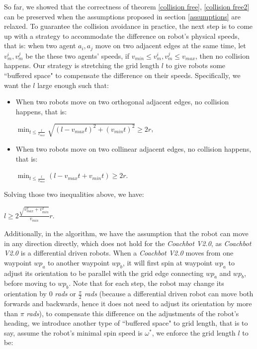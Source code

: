 \documentclass[journal]{IEEEtran}
\begin{document}
So far, we showed that the correctness of theorem \ref{collision free}, \ref{collision free2} can be preserved when the assumptions proposed in section \ref{assumptions} are relaxed. To guarantee the collision avoidance in practice, the next step is to come up with a strategy to accommodate the difference on robot's physical speeds, that is: when two agent $a_i, a_j$ move on two adjacent edges at the same time, let $v_m^i, v_m^j$ be the these two agents' speeds, if $v_{min}\leq v_m^i, v_m^j\leq v_{max}$, then no collision happens. Our strategy is stretching the grid length $l$ to give robots some ``buffered space" to compensate the difference on their speeds. Specifically, we want the $l$ large enough such that:
\begin{itemize}

    \item When two robots move on two orthogonal adjacent edges, no collision happens, that is: 
    
    \centering$\min_{t\leq \frac{l}{v_{max}}}\sqrt{(l-v_{max}t)^2 + (v_{min}t)^2} \geq 2r$,


\item \raggedright When two robots move on two collinear adjacent edges, no collision happens, that is: 

\centering$\min_{t\leq \frac{l}{v_{max}}}(l-v_{max}t + v_{min}t) \geq 2r$.

\end{itemize}

Solving those two inequalities above, we have:

\begin{center}{ $l\geq 2\frac{\sqrt{v_{max}^2 + v_{min}^2}}{v_{min}}r$.}\end{center} 


Additionally, in the algorithm, we have the assumption that the robot can move in any direction directly, which does not hold for the \textit{Coachbot V2.0}, as \textit{Coachbot V2.0} is a differential driven robots. When a \textit{Coachbot V2.0} moves from one waypoint $wp_{a}$ to another waypoint $wp_{b}$, it will first spin at waypoint $wp_{a}$ to adjust its orientation to be parallel with the grid edge connecting $wp_{a}$ and $wp_{b}$, before moving to $wp_{b}$. Note that for each step, the robot may change its orientation by $0$ \textit{rads} or $\frac{\pi}{2}$ \textit{rads} (because a differential driven robot can move both forwards and backwards, hence it does not need to adjust its orientation by more than $\pi$ \textit{rads}), to compensate this difference on the adjustments of the robot's heading, we introduce another type of  ``buffered space" to grid length, that is to say, assume the robot's minimal spin speed is $\omega^*$, we enforce the grid length $l$ to be:
\end{document}
